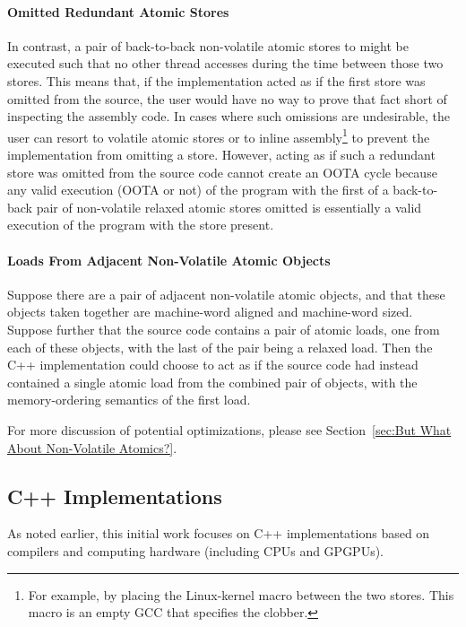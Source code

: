 \documentclass[10]{article}
\begin{document}
\paragraph{Omitted Redundant Atomic Stores}
In contrast, a pair of back-to-back non-volatile atomic stores to 
might be executed such that no other thread accesses 
during the time between those two stores.
This means that, if the implementation acted as if the first store was omitted
from the source, the user would have no way to prove that fact short of
inspecting the assembly code.
In cases where such omissions are undesirable, the user can resort to
volatile atomic stores or to inline assembly\footnote{
	For example, by placing the Linux-kernel  macro
	between the two stores.
	This macro is an empty GCC  that specifies the 
	clobber.}
to prevent the implementation from omitting a store.
However, acting as if such a redundant store was omitted from the source
code cannot create an OOTA cycle because any valid execution (OOTA or not)
of the program with the first of a back-to-back pair of non-volatile
relaxed atomic stores omitted is essentially a valid execution of the
program with the store present.

\paragraph{Loads From Adjacent Non-Volatile Atomic Objects}

Suppose there are a pair of adjacent non-volatile atomic objects,
and that these objects taken together are machine-word aligned
and machine-word sized.
Suppose further that the source code contains a pair of atomic
loads, one from each of these objects, with the last of the pair
being a relaxed load.
Then the C++ implementation could choose to act as if the source code
had instead contained a single atomic load from the combined
pair of objects, with the memory-ordering semantics of the first load.

For more discussion of potential optimizations, please see
Section~\ref{sec:But What About Non-Volatile Atomics?}.

\subsection{C++ Implementations}
\label{sec:C++ Implementations}

As noted earlier, this initial work focuses on C++ implementations based
on compilers and computing hardware (including CPUs and GPGPUs).
\end{document}
